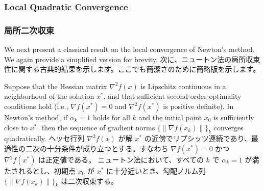 \documentclass[0_main]{subfiles}
\begin{document}
\ifEn
    \subsubsection{Local Quadratic Convergence}
\else
    \subsubsection{局所二次収束}
\fi

\ifEn
    We next present a classical result on the local convergence of Newton's method. We again provide a simplified version for brevity.
\else
    次に、ニュートン法の局所収束性に関する古典的結果を示します。ここでも簡潔さのために簡略版を示します。
\fi

\begin{theorem}
    \label{thm:newton-quadratic}
    \ifEn
        Suppose that the Hessian matrix $\nabla^2 f(x)$ is Lipschitz continuous in a neighborhood of the solution $x^*$, and that sufficient second-order optimality conditions hold (i.e., $\nabla f(x^*)=0$ and $\nabla^2 f(x^*)$ is positive definite).
        In Newton's method, if $\alpha_k=1$ holds for all $k$ and the initial point $x_0$ is sufficiently close to $x^*$, then the sequence of gradient norms $\{\left\lVert \nabla f(x_k) \right\rVert\}_k$ converges quadratically.
    \else
        ヘッセ行列 $\nabla^2 f(x)$ が解 $x^*$ の近傍でリプシッツ連続であり、最適性の二次の十分条件が成り立つとする。すなわち $\nabla f(x^*)=0$ かつ $\nabla^2 f(x^*)$ は正定値である。
        ニュートン法において、すべての $k$ で $\alpha_k=1$ が満たされるとし、初期点 $x_0$ が $x^*$ に十分近いとき、勾配ノルム列 $\{\left\lVert \nabla f(x_k) \right\rVert\}_k$ は二次収束する。
    \fi
\end{theorem}
\end{document}
